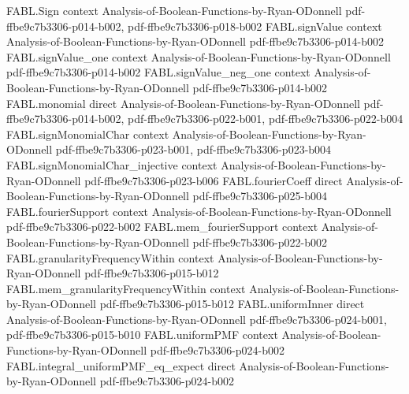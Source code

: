\begin{theorem}
\label{FABL.productInner_uniformSign}
\leanok
{}
\proofstep
  {FABL.Sign}
  {context}
  {Analysis-of-Boolean-Functions-by-Ryan-ODonnell}
  {pdf-ffbe9c7b3306-p014-b002,
    pdf-ffbe9c7b3306-p018-b002}
\proofstep
  {FABL.signValue}
  {context}
  {Analysis-of-Boolean-Functions-by-Ryan-ODonnell}
  {pdf-ffbe9c7b3306-p014-b002}
\proofstep
  {FABL.signValue_one}
  {context}
  {Analysis-of-Boolean-Functions-by-Ryan-ODonnell}
  {pdf-ffbe9c7b3306-p014-b002}
\proofstep
  {FABL.signValue_neg_one}
  {context}
  {Analysis-of-Boolean-Functions-by-Ryan-ODonnell}
  {pdf-ffbe9c7b3306-p014-b002}
\proofstep
  {FABL.monomial}
  {direct}
  {Analysis-of-Boolean-Functions-by-Ryan-ODonnell}
  {pdf-ffbe9c7b3306-p014-b002,
    pdf-ffbe9c7b3306-p022-b001,
    pdf-ffbe9c7b3306-p022-b004}
\proofstep
  {FABL.signMonomialChar}
  {context}
  {Analysis-of-Boolean-Functions-by-Ryan-ODonnell}
  {pdf-ffbe9c7b3306-p023-b001,
    pdf-ffbe9c7b3306-p023-b004}
\proofstep
  {FABL.signMonomialChar_injective}
  {context}
  {Analysis-of-Boolean-Functions-by-Ryan-ODonnell}
  {pdf-ffbe9c7b3306-p023-b006}
\proofstep
  {FABL.fourierCoeff}
  {direct}
  {Analysis-of-Boolean-Functions-by-Ryan-ODonnell}
  {pdf-ffbe9c7b3306-p025-b004}
\proofstep
  {FABL.fourierSupport}
  {context}
  {Analysis-of-Boolean-Functions-by-Ryan-ODonnell}
  {pdf-ffbe9c7b3306-p022-b002}
\proofstep
  {FABL.mem_fourierSupport}
  {context}
  {Analysis-of-Boolean-Functions-by-Ryan-ODonnell}
  {pdf-ffbe9c7b3306-p022-b002}
\proofstep
  {FABL.granularityFrequencyWithin}
  {context}
  {Analysis-of-Boolean-Functions-by-Ryan-ODonnell}
  {pdf-ffbe9c7b3306-p015-b012}
\proofstep
  {FABL.mem_granularityFrequencyWithin}
  {context}
  {Analysis-of-Boolean-Functions-by-Ryan-ODonnell}
  {pdf-ffbe9c7b3306-p015-b012}
\proofstep
  {FABL.uniformInner}
  {direct}
  {Analysis-of-Boolean-Functions-by-Ryan-ODonnell}
  {pdf-ffbe9c7b3306-p024-b001,
    pdf-ffbe9c7b3306-p015-b010}
\proofstep
  {FABL.uniformPMF}
  {context}
  {Analysis-of-Boolean-Functions-by-Ryan-ODonnell}
  {pdf-ffbe9c7b3306-p024-b002}
\proofstep
  {FABL.integral_uniformPMF_eq_expect}
  {direct}
  {Analysis-of-Boolean-Functions-by-Ryan-ODonnell}
  {pdf-ffbe9c7b3306-p024-b002}

\end{theorem}
